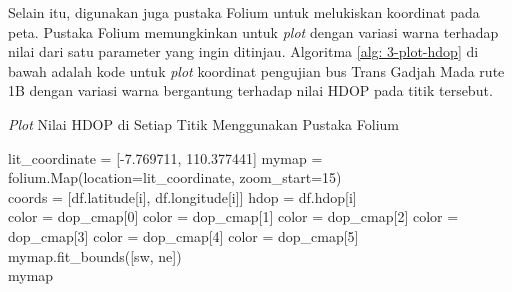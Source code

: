 Selain itu, digunakan juga pustaka Folium untuk melukiskan koordinat pada peta. Pustaka Folium memungkinkan untuk \textit{plot} dengan variasi warna terhadap nilai dari satu parameter yang ingin ditinjau. Algoritma \ref{alg: 3-plot-hdop} di bawah adalah kode untuk \textit{plot} koordinat pengujian bus Trans Gadjah Mada rute 1B dengan variasi warna bergantung terhadap nilai HDOP pada titik tersebut.

\begin{algorithm}[H]
	\caption{\textit{Plot} Nilai HDOP di Setiap Titik Menggunakan Pustaka Folium}
	\label{alg: 3-plot-hdop}
	\begin{algorithmic}[1]
		\State lit\_coordinate = [-7.769711, 110.377441]
		\State mymap = folium.Map(location=lit\_coordinate, zoom\_start=15)
		\\
			\State coords = [df.latitude[i], df.longitude[i]]
			\State hdop = df.hdop[i]
			\\
				\State color = dop\_cmap[0]
				\State color = dop\_cmap[1]
				\State color = dop\_cmap[2]
				\State color = dop\_cmap[3]
				\State color = dop\_cmap[4]
			\Else
				\State color = dop\_cmap[5]
			\EndIf
		\EndFor
		\\
		\State mymap.fit\_bounds([sw, ne]) 
		\\
		\State mymap		
	\end{algorithmic}
\end{algorithm}